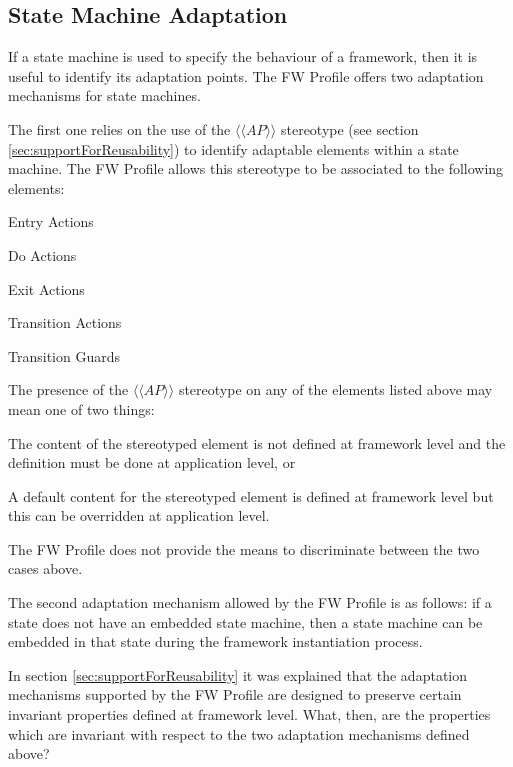 \documentclass[definition]{../fwprofile}
\begin{document}
\subsection{State Machine Adaptation}\label{sec:stateMachineAdaptation} 
If a state machine is used to specify the behaviour of a framework, then it is useful to identify
its adaptation points. The FW Profile offers two adaptation mechanisms for state machines.

The first one relies on the use of the $\langle\langle AP \rangle\rangle$ stereotype (see section \ref{sec:supportForReusability}) 
to identify adaptable elements within a state machine. The FW Profile allows this stereotype to be associated to the
following elements:

\begin{fw_itemize} 
\item Entry Actions
\item Do Actions
\item Exit Actions
\item Transition Actions
\item Transition Guards
\end{fw_itemize}

The presence of the $\langle\langle AP \rangle\rangle$ stereotype on any of the elements listed above may mean one of
two things:

\begin{fw_enumerate} 
\item The content of the stereotyped element is not defined at framework level and the
definition must be done at application level, or
\item A default content for the stereotyped element is defined at framework level but this
can be overridden at application level.
\end{fw_enumerate}

The FW Profile does not provide the means to discriminate between the two cases above.

The second adaptation mechanism allowed by the FW Profile is as follows: if a state does not
have an embedded state machine, then a state machine can be embedded in that state during
the framework instantiation process.

In section \ref{sec:supportForReusability} it was explained that the adaptation mechanisms supported by the FW Profile are
designed to preserve certain invariant properties defined at framework level. What, then, are
the properties which are invariant with respect to the two adaptation mechanisms defined
above?
\end{document}
